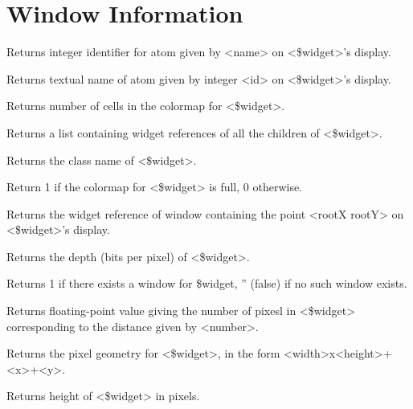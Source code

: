 
\section{Window Information}

\begin{enum}{1cm}

Returns integer identifier for atom given by <name> on <\$widget>'s display.

Returns textual name of atom given by integer <id> on <\$widget>'s display.

Returns number of cells in the colormap for <\$widget>.

Returns a list containing widget references of all the children of <\$widget>.

Returns the class name of <\$widget>.

Return 1 if the colormap for <\$widget> is full, 0 otherwise.

Returns the widget reference of window containing the point <rootX rootY>
on <\$widget>'s display.

Returns the depth (bits per pixel) of <\$widget>.

Returns 1 if there exists a window for \$widget, '' (false) if no such window exists. 

Returns floating-point value giving the number of pixesl in <\$widget>
corresponding to the distance given by <number>.

Returns the pixel geometry for <\$widget>, in the form <width>x<height>+<x>+<y>.

Returns height of <\$widget> in pixels.


\end{enum}
